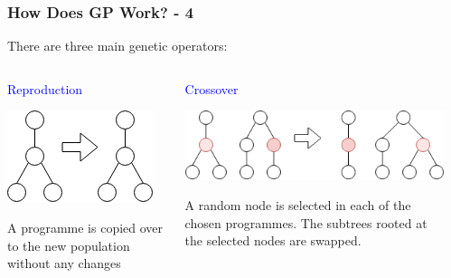 \documentclass{beamer}
\newcommand{\blue}[1]{\textcolor{blue}{#1}}
\begin{document}
		\begin{frame}
			
			\frametitle{How Does GP Work? - 4}
			
			There are three main genetic operators:
			
			\medskip
			\pause
			
			\begin{columns}[T]
				
				\begin{column}{0.2\textwidth}
					
					\blue{Reproduction}
					
					\medskip
					
					\includegraphics[scale=0.35]{resources/5_reproduction}
					
					\begin{small}
						A programme is copied over to the new population without any changes
					\end{small}
				
				\end{column}
			
				\pause
			
				\begin{column}{0.4\textwidth}
					
					\blue{Crossover}
					
					\medskip
					
					\includegraphics[scale=0.35]{resources/6_crossover}
					\begin{small}
						A random node is selected in each of the chosen programmes. The subtrees rooted at the selected nodes are swapped.
					\end{small}
			
				\end{column}
			
				\pause
			
				\begin{column}{0.3\textwidth}
					

\end{column}
\end{columns}
\end{frame}
\end{document}
